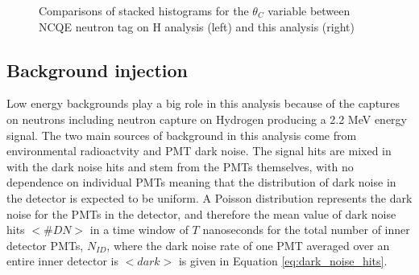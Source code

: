 \begin{figure}[!htbp]
    \centering
    
    \caption{Comparisons of stacked histograms for the $\theta_C$ variable between NCQE neutron tag on H analysis (left) and this analysis (right)} \label{fig:angle_reduction} 
    
     \hfill 
     \par
    
        
\end{figure}

\subsection{Background injection}

Low energy backgrounds play a big role in this analysis because of the captures on neutrons including neutron capture on Hydrogen producing a 2.2 MeV energy signal. The two main sources of background in this analysis come from environmental radioactvity and PMT dark noise. The signal hits are mixed in with the dark noise hits and stem from the PMTs themselves, with no dependence on individual PMTs meaning that the distribution of dark noise in the detector is expected to be uniform. A Poisson distribution represents the dark noise for the PMTs in the detector, and therefore the mean value of dark noise hits $<\#DN>$ in a time window of $T$ nanoseconds for the total number of inner detector PMTs, $N_{ID}$, where the dark noise rate of one PMT averaged over an entire inner detector is $<dark>$ is given in Equation \ref{eq:dark_noise_hits}. 



